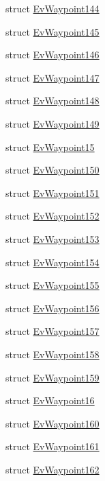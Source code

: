 \begin{DoxyCompactItemize}
\item 
struct \hyperlink{structcl__move__base__z_1_1EvWaypoint144}{Ev\+Waypoint144}
\item 
struct \hyperlink{structcl__move__base__z_1_1EvWaypoint145}{Ev\+Waypoint145}
\item 
struct \hyperlink{structcl__move__base__z_1_1EvWaypoint146}{Ev\+Waypoint146}
\item 
struct \hyperlink{structcl__move__base__z_1_1EvWaypoint147}{Ev\+Waypoint147}
\item 
struct \hyperlink{structcl__move__base__z_1_1EvWaypoint148}{Ev\+Waypoint148}
\item 
struct \hyperlink{structcl__move__base__z_1_1EvWaypoint149}{Ev\+Waypoint149}
\item 
struct \hyperlink{structcl__move__base__z_1_1EvWaypoint15}{Ev\+Waypoint15}
\item 
struct \hyperlink{structcl__move__base__z_1_1EvWaypoint150}{Ev\+Waypoint150}
\item 
struct \hyperlink{structcl__move__base__z_1_1EvWaypoint151}{Ev\+Waypoint151}
\item 
struct \hyperlink{structcl__move__base__z_1_1EvWaypoint152}{Ev\+Waypoint152}
\item 
struct \hyperlink{structcl__move__base__z_1_1EvWaypoint153}{Ev\+Waypoint153}
\item 
struct \hyperlink{structcl__move__base__z_1_1EvWaypoint154}{Ev\+Waypoint154}
\item 
struct \hyperlink{structcl__move__base__z_1_1EvWaypoint155}{Ev\+Waypoint155}
\item 
struct \hyperlink{structcl__move__base__z_1_1EvWaypoint156}{Ev\+Waypoint156}
\item 
struct \hyperlink{structcl__move__base__z_1_1EvWaypoint157}{Ev\+Waypoint157}
\item 
struct \hyperlink{structcl__move__base__z_1_1EvWaypoint158}{Ev\+Waypoint158}
\item 
struct \hyperlink{structcl__move__base__z_1_1EvWaypoint159}{Ev\+Waypoint159}
\item 
struct \hyperlink{structcl__move__base__z_1_1EvWaypoint16}{Ev\+Waypoint16}
\item 
struct \hyperlink{structcl__move__base__z_1_1EvWaypoint160}{Ev\+Waypoint160}
\item 
struct \hyperlink{structcl__move__base__z_1_1EvWaypoint161}{Ev\+Waypoint161}
\item 
struct \hyperlink{structcl__move__base__z_1_1EvWaypoint162}{Ev\+Waypoint162}

\end{DoxyCompactItemize}
